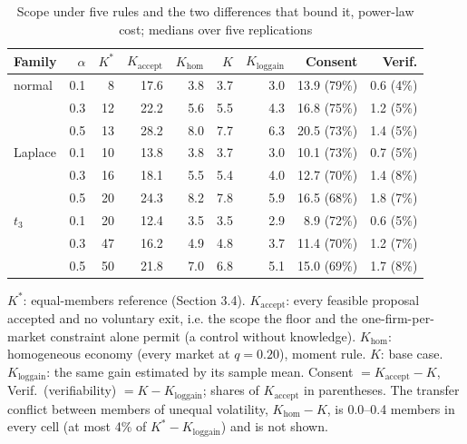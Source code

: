 \begin{table}[htbp]
\centering
\caption{Scope under five rules and the two differences that bound it, power-law cost; medians over five replications}
\label{tab:decomposition}
\small
\begin{tabular}{lrrrrrrrr}
\toprule
Family & $\alpha$ & $K^*$ & $K_{\text{accept}}$ & $K_{\text{hom}}$ & $K$ & $K_{\text{loggain}}$ & Consent & Verif. \\
\midrule
normal & 0.1 & 8 & 17.6 & 3.8 & 3.7 & 3.0 & 13.9 (79\%) & 0.6 (4\%) \\
 & 0.3 & 12 & 22.2 & 5.6 & 5.5 & 4.3 & 16.8 (75\%) & 1.2 (5\%) \\
 & 0.5 & 13 & 28.2 & 8.0 & 7.7 & 6.3 & 20.5 (73\%) & 1.4 (5\%) \\
\midrule
Laplace & 0.1 & 10 & 13.8 & 3.8 & 3.7 & 3.0 & 10.1 (73\%) & 0.7 (5\%) \\
 & 0.3 & 16 & 18.1 & 5.5 & 5.4 & 4.0 & 12.7 (70\%) & 1.4 (8\%) \\
 & 0.5 & 20 & 24.3 & 8.2 & 7.8 & 5.9 & 16.5 (68\%) & 1.8 (7\%) \\
\midrule
$t_3$ & 0.1 & 20 & 12.4 & 3.5 & 3.5 & 2.9 & 8.9 (72\%) & 0.6 (5\%) \\
 & 0.3 & 47 & 16.2 & 4.9 & 4.8 & 3.7 & 11.4 (70\%) & 1.2 (7\%) \\
 & 0.5 & 50 & 21.8 & 7.0 & 6.8 & 5.1 & 15.0 (69\%) & 1.7 (8\%) \\
\bottomrule
\end{tabular}
\par\smallskip\begin{minipage}{0.95\linewidth}\footnotesize $K^*$: equal-members reference (Section 3.4). $K_{\text{accept}}$: every feasible proposal accepted and no voluntary exit, i.e. the scope the floor and the one-firm-per-market constraint alone permit (a control without knowledge). $K_{\text{hom}}$: homogeneous economy (every market at $q = 0.20$), moment rule. $K$: base case. $K_{\text{loggain}}$: the same gain estimated by its sample mean. Consent $= K_{\text{accept}} - K$, Verif.\ (verifiability) $= K - K_{\text{loggain}}$; shares of $K_{\text{accept}}$ in parentheses. The transfer conflict between members of unequal volatility, $K_{\text{hom}} - K$, is 0.0--0.4 members in every cell (at most 4\% of $K^* - K_{\text{loggain}}$) and is not shown.\end{minipage}
\end{table}

